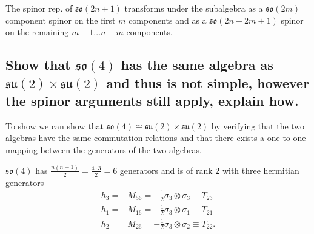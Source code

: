 \documentclass[main.tex]{subfiles}
\begin{document}
The spinor rep. of $\mathfrak{so}(2n+1)$ transforms under the subalgebra as a $\mathfrak{so}(2m)$ component spinor on the first $m$ components and as a $\mathfrak{so}(2n-2m+1)$ spinor on the remaining $m+1...n-m$ components.

\subsection{Show that $\mathfrak{so}(4)$ has the same algebra as $\mathfrak{su}(2)\times\mathfrak{su}(2)$ and thus is not simple, however the spinor arguments still apply, explain how.}

To show we can show that $\mathfrak{so}(4)\cong\mathfrak{su}(2)\times\mathfrak{su}(2)$ by verifying that the two algebras have the same commutation relations and that there exists a one-to-one mapping between the generators of the two algebras. 

$\mathfrak{so}(4)$ has $\frac{n(n-1)}{2}=\frac{4\cdot3}{2}=6$ generators and is of rank $2$ with three hermitian generators
\begin{align}
h_3=&M_{56}=-\frac{1}{2}\sigma_3\otimes\sigma_3\equiv T_{23}\\
h_1=&M_{16}=-\frac{1}{2}\sigma_3\otimes\sigma_1\equiv T_{21}\\
h_2=&M_{26}=-\frac{1}{2}\sigma_3\otimes\sigma_2\equiv T_{22}.
\end{align}
\end{document}

